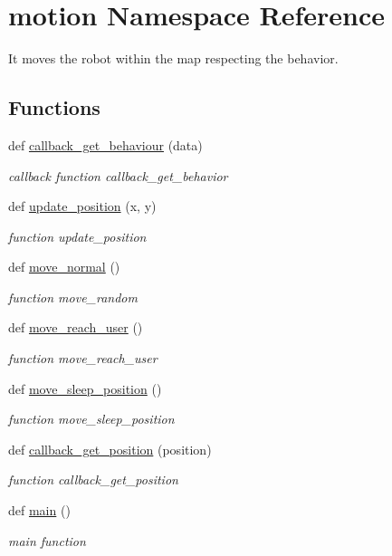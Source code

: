 \hypertarget{namespacemotion}{}\section{motion Namespace Reference}
\label{namespacemotion}


It moves the robot within the map respecting the behavior.  


\subsection*{Functions}
\begin{DoxyCompactItemize}
\item 
def \hyperlink{namespacemotion_a223e65905edcd5f4605198efb23d2ca3}{callback\+\_\+get\+\_\+behaviour} (data)
\begin{DoxyCompactList}\small\item\em callback function callback\+\_\+get\+\_\+behavior \end{DoxyCompactList}\item 
def \hyperlink{namespacemotion_a9a93c5fd6c8938302c99cdc865f34cb8}{update\+\_\+position} (x, y)
\begin{DoxyCompactList}\small\item\em function update\+\_\+position \end{DoxyCompactList}\item 
def \hyperlink{namespacemotion_ab5144d84b423263e4fa8c03c453d975c}{move\+\_\+normal} ()
\begin{DoxyCompactList}\small\item\em function move\+\_\+random \end{DoxyCompactList}\item 
def \hyperlink{namespacemotion_ab22dd13019d977ca14ccf9a84d7f224a}{move\+\_\+reach\+\_\+user} ()
\begin{DoxyCompactList}\small\item\em function move\+\_\+reach\+\_\+user \end{DoxyCompactList}\item 
def \hyperlink{namespacemotion_a7e28371ac015cdd23c39095626abce98}{move\+\_\+sleep\+\_\+position} ()
\begin{DoxyCompactList}\small\item\em function move\+\_\+sleep\+\_\+position \end{DoxyCompactList}\item 
def \hyperlink{namespacemotion_aea14bdb6100f2e8e6035a4487c861bc7}{callback\+\_\+get\+\_\+position} (position)
\begin{DoxyCompactList}\small\item\em function callback\+\_\+get\+\_\+position \end{DoxyCompactList}\item 
def \hyperlink{namespacemotion_ad6289fca8572f5af95fd28f4c2dbc68d}{main} ()
\begin{DoxyCompactList}\small\item\em main function \end{DoxyCompactList}\end{DoxyCompactItemize}
